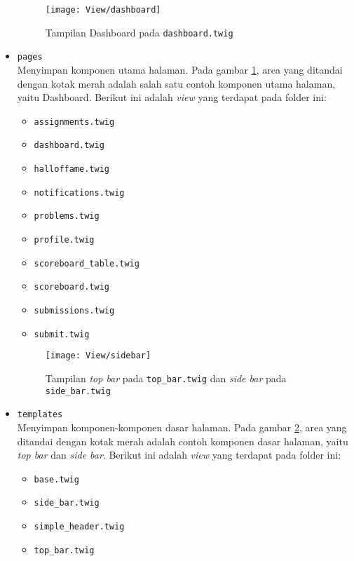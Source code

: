\begin{itemize}
    \begin{figure}[H]
    	\centering  
    	\texttt{[image: View/dashboard]}  
    	\caption{Tampilan Dashboard pada \texttt{dashboard.twig}}
    	\label{fig:3:viewsubmit} 
    \end{figure} 
    
    \item \verb|pages| \\ Menyimpan komponen utama halaman. Pada gambar \ref{fig:3:viewsubmit}, area yang ditandai dengan kotak merah adalah salah satu contoh komponen utama halaman, yaitu Dashboard. Berikut ini adalah \textit{view} yang terdapat pada folder ini: 
    \begin{itemize}
        \item \verb|assignments.twig|
        \item \verb|dashboard.twig|
        \item \verb|halloffame.twig|
        \item \verb|notifications.twig|
        \item \verb|problems.twig|
        \item \verb|profile.twig|
        \item \verb|scoreboard_table.twig|
        \item \verb|scoreboard.twig|
        \item \verb|submissions.twig|
        \item \verb|submit.twig|
    \end{itemize}

    \begin{figure}[H]
    	\centering
    	\texttt{[image: View/sidebar]}  
    	\caption{Tampilan \textit{top bar} pada \texttt{top\_bar.twig} dan \textit{side bar} pada \texttt{side\_bar.twig}}
    	\label{fig:3:viewsidebar} 
    \end{figure} 
    
    \item \verb|templates| \\ Menyimpan komponen-komponen dasar halaman. Pada gambar \ref{fig:3:viewsidebar}, area yang ditandai dengan kotak merah adalah contoh komponen dasar halaman, yaitu \textit{top bar} dan \textit{side bar}. Berikut ini adalah \textit{view} yang terdapat pada folder ini: 
    \begin{itemize}
        \item \verb|base.twig|
        \item \verb|side_bar.twig|
        \item \verb|simple_header.twig|
        \item \verb|top_bar.twig|
    \end{itemize}
    

\end{itemize}
